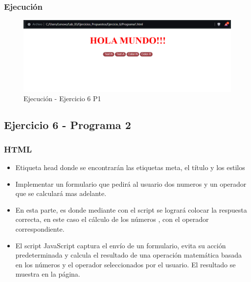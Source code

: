 \documentclass{article}
\begin{document}
	\subsubsection{Ejecución}
	\begin{figure}[H]
		\centering
		\includegraphics[width=1\textwidth,keepaspectratio]{img/HTML5.png}
		\caption{Ejecución - Ejercicio 6 P1}
	\end{figure}
	\subsection{Ejercicio 6 - Programa 2}
	\subsubsection{HTML}
	\begin{itemize}
		\item Etiqueta head donde se encontrarán las etiquetas meta, el título y los estilos  
		
		\item Implementar un formulario que pedirá al usuario dos numeros y un operador que se calculará mas adelante.
		
		\item En esta parte, es donde mediante con el script se logrará colocar la respuesta correcta, en este caso el cálculo de los números , con el operador correspondiente.
		
		\item El script JavaScript captura el envío de un formulario, evita su acción predeterminada y calcula el resultado de una operación matemática basada en los números y el operador seleccionados por el usuario. El resultado se muestra en la página.
		
	\end{itemize}
\end{document}
